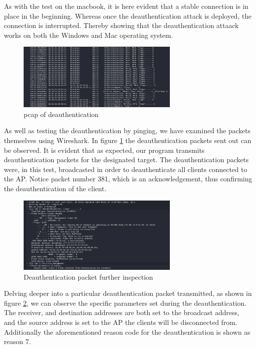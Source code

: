 As with the test on the macbook, it is here evident that a stable connection is in place in the beginning. Whereas once the deauthentication attack is deployed, the connection is interrupted. Thereby showing that the deauthentication attaack works on both the Windows and Mac operating system.

\begin{figure}[H]
    \centering
    \includegraphics[width=0.7\textwidth]{Latex-Files/Billeder/Tests/deauth_pcap.png}
    \caption{pcap of deauthentication}
    \label{deauth_pcap}
\end{figure}

As well as testing the deauthentication by pinging, we have examined the packets themselves using Wireshark. In figure \ref{deauth_pcap} the deauthentication packets sent out can be observed. It is evident that as expected, our program transmits deauthentication packets for the designated target. The deauthentication packets were, in this test, broadcasted in order to deauthenticate all clients connected to the AP. 
Notice packet number 381, which is an acknowledgement, thus confirming the deauthentication of the client.


\begin{figure}[H]
    \centering
    \includegraphics[width=0.7\textwidth]{Latex-Files/Billeder/Tests/deauth_pcap_packet.png}
    \caption{Deauthentication packet further inspection}
    \label{deauth_pcap_packet}
\end{figure}

Delving deeper into a particular deauthentication packet transmitted, as shown in figure \ref{deauth_pcap_packet}, we can observe the specific parameters set during the deauthentication. The receiver, and destination addresses are both set to the broadcast address, and the source address is set to the AP the clients will be disconnected from. Additionally the aforementioned reason code for the deauthentication is shown as reason 7.



